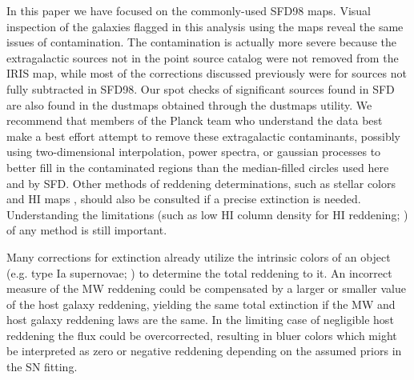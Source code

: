 \documentclass[twocolumn]{aastex63}
\begin{document}
In this paper we have focused on the commonly-used SFD98 maps.  Visual inspection of the galaxies flagged in this analysis using the \citet{Planck_etal_2014} maps reveal the same issues of contamination.  The \citet{Planck_etal_2014} contamination is actually more severe because the extragalactic sources not in the point source catalog were not removed from the IRIS map, while most of the corrections discussed previously were for sources not fully subtracted in SFD98.  Our spot checks of significant sources found in SFD are also found in the \citet{Planck_etal_2014} dustmaps obtained through the dustmaps utility. We recommend that members of the Planck team who understand the data best make a best effort attempt to remove these extragalactic contaminants, possibly using two-dimensional interpolation, power spectra, or gaussian processes to better fill in the contaminated regions than the median-filled circles used here and by SFD.   Other methods of reddening determinations, such as stellar colors \citep{Green_etal_2019} and HI maps \citep{Lenz_etal_2017}, should also be consulted if a precise extinction is needed.  Understanding the limitations (such as low HI column density for HI reddening; \citealp{Lenz_etal_2017}) of any method is still important. 


Many corrections for extinction already utilize the intrinsic colors of an object (e.g. type Ia supernovae; \citealp{Phillips_etal_1999}) to determine the total reddening to it.  An incorrect measure of the MW reddening could be compensated by a larger or smaller value of the host galaxy reddening, yielding the same total extinction if the MW and host galaxy reddening laws are the same.  In the  limiting case of negligible host reddening the flux could be overcorrected, resulting in bluer colors which might be interpreted as zero or negative reddening depending on the assumed priors in the SN fitting.
\end{document}

